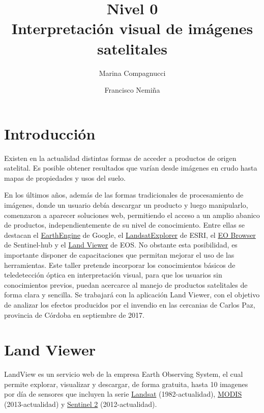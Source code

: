 \documentclass[a4paper,12pt]{book}
\title{{\large Nivel 0} \\ Interpretación visual de imágenes satelitales}
\author{Marina Compagnucci \and Francisco Nemiña}
\begin{document}
\maketitle
\titlepage

\chapter{Introducción}
Existen en la actualidad distintas formas de acceder a productos de origen satelital. Es posible obtener resultados que varían desde imágenes en crudo hasta mapas de propiedades y usos del suelo.

En los últimos años, además de las formas tradicionales de procesamiento de imágenes, donde un usuario debía descargar un producto y luego manipularlo, comenzaron a aparecer soluciones web, permitiendo el acceso a un amplio abanico de productos, independientemente de su nivel de conocimiento. Entre ellas se destacan el \href{https://explorer.earthengine.google.com/#workspace}{EarthEngine} de Google, el \href{http://landsatexplorer.esri.com/}{LandsatExplorer} de ESRI, el \href{http://apps.sentinel-hub.com/eo-browser/}{EO Browser} de Sentinel-hub y el \href{lv.eosda.com}{Land Viewer} de EOS.
No obstante esta posibilidad, es importante disponer de capacitaciones que permitan mejorar el uso de las herramientas. Este taller pretende incorporar los conocimientos básicos de teledetección óptica en interpretación visual, para que los usuarios sin conocimientos previos, puedan acercarce al manejo de productos satelitales de forma clara y sencilla.
Se trabajará con la aplicación Land Viewer, con el objetivo de analizar los efectos producidos por el invendio en las cercanias de Carlos Paz, provincia de Córdoba en septiembre de 2017.

\chapter{Land Viewer}

LandView es un servicio web de la empresa Earth Observing System, el cual permite explorar, visualizar y descargar, de forma gratuita, hasta 10 imagenes por día de sensores que incluyen la serie \href{https://landsat.usgs.gov/}{Landsat} (1982-actualidad), \href{https://lpdaac.usgs.gov/dataset_discovery/modis/modis_products_table/mcd43a4}{MODIS} (2013-actualidad) y \href{https://sentinel.esa.int/web/sentinel/missions/sentinel-2}{Sentinel 2} (2012-actualidad). %
\end{document}
